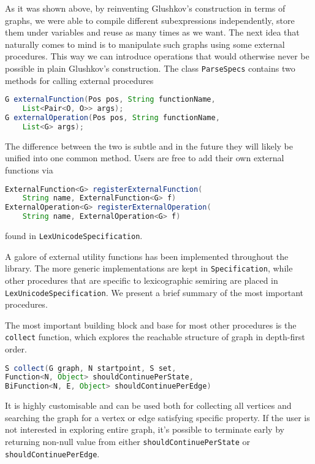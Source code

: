 \documentclass[12pt]{article}
\begin{document}
As it was shown above, by reinventing Glushkov's construction in terms of graphs, we were able to compile different subexpressions independently, store them under variables and reuse as many times as we want. The next idea that naturally comes to mind is to manipulate such graphs using some external procedures. This way we can introduce operations that  would otherwise never be possible in plain Glushkov's construction.
The class \texttt{ParseSpecs} contains two methods for calling external procedures
\begin{lstlisting}[language=java]
G externalFunction(Pos pos, String functionName, 
    List<Pair<O, O>> args);
G externalOperation(Pos pos, String functionName, 
    List<G> args);
\end{lstlisting}
The difference between the two is subtle and in the future they will likely be unified into one common method. Users are free to add their own external functions via
\begin{lstlisting}[language=java]
ExternalFunction<G> registerExternalFunction(
    String name, ExternalFunction<G> f)
ExternalOperation<G> registerExternalOperation(
    String name, ExternalOperation<G> f)
\end{lstlisting}
found in \texttt{LexUnicodeSpecification}.

A galore of external utility functions has been implemented throughout the library. The more generic implementations are kept in \texttt{Specification}, while other procedures that are specific to lexicographic semiring are placed in \texttt{LexUnicodeSpecification}. We present a brief summary of the most important procedures.

The most important building block and base for most other procedures is the \texttt{collect} function, which explores the reachable structure of graph in depth-first order.
\begin{lstlisting}[language=java]
S collect(G graph, N startpoint, S set,
Function<N, Object> shouldContinuePerState,
BiFunction<N, E, Object> shouldContinuePerEdge)
\end{lstlisting}
It is highly customisable and can be used both for collecting all vertices and searching the graph for a vertex or edge satisfying specific property. If the user is not interested in exploring entire graph, it's possible to terminate early by returning non-null value from either \texttt{shouldContinuePerState} or \texttt{shouldContinuePerEdge}. 
\end{document}
